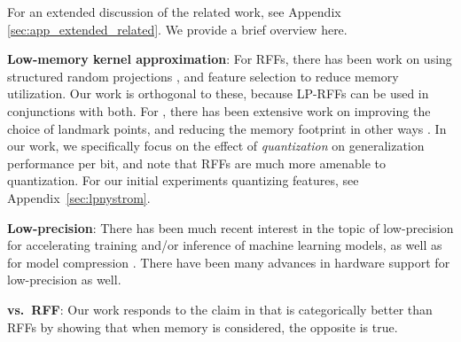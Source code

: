 For an extended discussion of the related work, see Appendix \ref{sec:app_extended_related}. We provide a brief overview here.

\textbf{Low-memory kernel approximation}: For RFFs, there has been work on using structured random projections \citep{fastfood,yu15,sphereRKS}, and feature selection \citep{sparseRKS, may2016} to reduce memory utilization. Our work is orthogonal to these, because LP-RFFs can be used in conjunctions with both. For \NystromNS, there has been extensive work on improving the choice of landmark points, and reducing the memory footprint in other ways \cite{ensemble09,fastpred14,meka14}. In our work, we specifically focus on the effect of \textit{quantization} on generalization performance per bit, and note that RFFs are much more amenable to quantization. For our initial experiments quantizing \Nystrom features, see Appendix~\ref{sec:lpnystrom}.

\textbf{Low-precision}: There has been much recent interest in the topic of low-precision for accelerating training and/or inference of machine learning models, as well as for model compression \citep{gupta15,hogwild15,hubara16,halp18,desa17,han15}.  There have been many advances in hardware support for low-precision as well\citep{tpu17,brainwave17}.

\textbf{\Nystrom vs.\ RFF}: Our work responds to the claim in \citet{nysvsrff12} that \Nystrom is categorically better than RFFs by showing that when memory is considered, the opposite is true.

